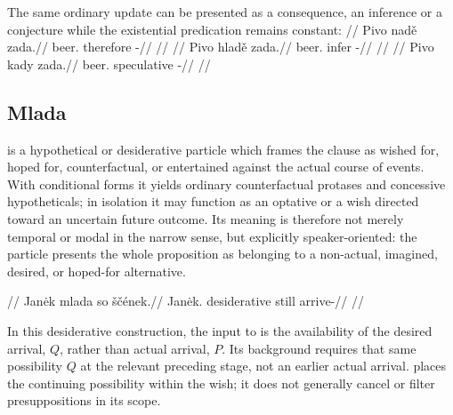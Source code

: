 \pex
{}
\xe

The same ordinary update can be presented as a consequence, an inference
or a conjecture while the existential predication remains constant:
\pex\label{ex:stance-household-contrast}
\a
\begingl
\glpreamble {}//
\gla Pivo nadě zada.//
\glb beer.\Dir{} therefore \NegExst{}-\Cont{}//
\glft {}//
\endgl
\a
\begingl
\glpreamble {}//
\gla Pivo hladě zada.//
\glb beer.\Dir{} infer \NegExst{}-\Cont{}//
\glft {}//
\endgl
\a
\begingl
\glpreamble {}//
\gla Pivo kady zada.//
\glb beer.\Dir{} speculative \NegExst{}-\Cont{}//
\glft {}//
\endgl
\xe

\subsection{Mlada}  is a hypothetical or desiderative particle
which frames the
clause as wished for, hoped for, counterfactual, or entertained against the
actual course of events. With conditional forms it yields ordinary
counterfactual protases and concessive hypotheticals; in isolation it may
function as an optative  or a wish directed toward an uncertain
future outcome. Its meaning is therefore not merely temporal or modal in the
narrow sense, but explicitly speaker-oriented: the particle presents the whole
proposition as belonging to a non-actual, imagined, desired, or hoped-for
alternative.

\pex
\begingl
\glpreamble {}//
\gla Janėk mlada so ščének.//
\glb Janėk.\Dir{} desiderative still arrive-\Pf{}//
\glft {}//
\endgl
\xe

In this desiderative construction, the input to  is the availability
of the desired arrival, $Q$, rather than actual arrival, $P$. Its background
requires that same possibility $Q$ at the relevant preceding stage, not an
earlier actual arrival.  places the continuing possibility within
the wish; it does not generally cancel or filter presuppositions in its scope.

